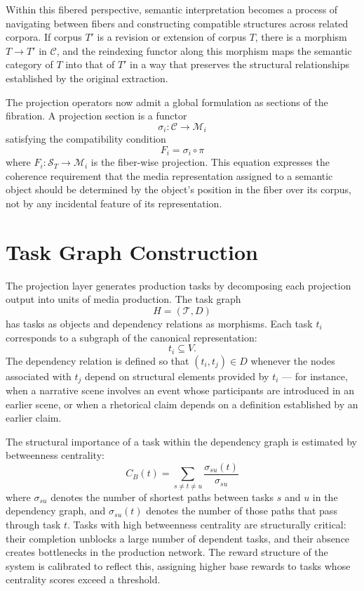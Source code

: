 \documentclass[12pt,a4paper]{article}
\begin{document}
Within this fibered perspective, semantic interpretation becomes a process of navigating between fibers and constructing compatible structures across related corpora. If corpus $T'$ is a revision or extension of corpus $T$, there is a morphism $T \to T'$ in $\mathcal{C}$, and the reindexing functor along this morphism maps the semantic category of $T$ into that of $T'$ in a way that preserves the structural relationships established by the original extraction.

The projection operators now admit a global formulation as sections of the fibration. A projection section is a functor
\[
\sigma_i : \mathcal{C} \rightarrow \mathcal{M}_i
\]
satisfying the compatibility condition
\[
F_i = \sigma_i \circ \pi
\]
where $F_i : \mathcal{S}_T \to \mathcal{M}_i$ is the fiber-wise projection. This equation expresses the coherence requirement that the media representation assigned to a semantic object should be determined by the object's position in the fiber over its corpus, not by any incidental feature of its representation.

\section{Task Graph Construction}

The projection layer generates production tasks by decomposing each projection output into units of media production. The task graph
\[
H = (\mathcal{T}, D)
\]
has tasks as objects and dependency relations as morphisms. Each task $t_i$ corresponds to a subgraph of the canonical representation:
\[
t_i \subseteq V.
\]
The dependency relation is defined so that $(t_i, t_j) \in D$ whenever the nodes associated with $t_j$ depend on structural elements provided by $t_i$ — for instance, when a narrative scene involves an event whose participants are introduced in an earlier scene, or when a rhetorical claim depends on a definition established by an earlier claim.

The structural importance of a task within the dependency graph is estimated by betweenness centrality:
\[
C_B(t) = \sum_{s \neq t \neq u} \frac{\sigma_{su}(t)}{\sigma_{su}}
\]
where $\sigma_{su}$ denotes the number of shortest paths between tasks $s$ and $u$ in the dependency graph, and $\sigma_{su}(t)$ denotes the number of those paths that pass through task $t$. Tasks with high betweenness centrality are structurally critical: their completion unblocks a large number of dependent tasks, and their absence creates bottlenecks in the production network. The reward structure of the system is calibrated to reflect this, assigning higher base rewards to tasks whose centrality scores exceed a threshold.
\end{document}
